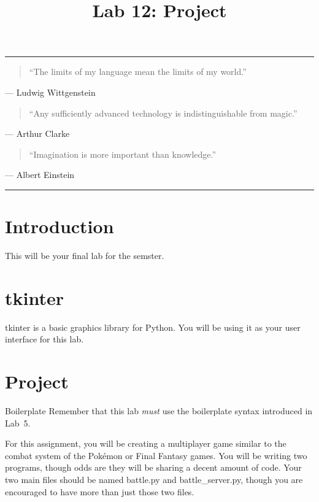 \documentclass[11pt]{cselabheader}
\title{Lab 12: Project}
\begin{document}
\maketitle

\hrule
\begin{quotation}
``The limits of my language mean the limits of my world.''
\end{quotation}
\begin{flushright}
--- Ludwig Wittgenstein
\end{flushright}

\begin{quotation}
``Any sufficiently advanced technology is indistinguishable from magic.''
\end{quotation}
\begin{flushright}
--- Arthur Clarke
\end{flushright}

\begin{quotation}
``Imagination is more important than knowledge.''
\end{quotation}
\begin{flushright}
--- Albert Einstein
\end{flushright}

\hrule

\section{Introduction}
This will be your final lab for the semster.

\pagebreak

\section{tkinter}
\label{sec:tk}
tkinter is a basic graphics library for Python. You will be using it as your
user interface for this lab.

\pagebreak

\section{Project}
\label{sec:proj}

\begin{warningbox}{Boilerplate}
  Remember that this lab \emph{must} use the
  boilerplate syntax introduced in Lab~5.
\end{warningbox}

For this assignment, you will be creating a multiplayer game similar to the
combat system of the Pok\'emon or Final Fantasy games. You will be writing
two programs, though odds are they will be sharing a decent amount of code.
Your two main files should be named battle.py and battle\_server.py, though
you are encouraged to have more than just those two files.
\end{document}
